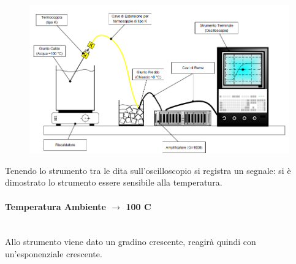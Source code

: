 \documentclass[a4paper, 12pt, twoside]{report}
\begin{document}
		\begin{figure}[H]
			\centering
			\includegraphics[width=0.5\linewidth]{immagini/catena1}
			\label{fig:catena1}
		\end{figure}		
		
		Tenendo lo strumento tra le dita sull'oscilloscopio si registra un segnale: si è dimostrato lo strumento essere sensibile alla temperatura. 
		
\newpage

		\paragraph{Temperatura Ambiente $\rightarrow$ 100 \degree C} \mbox{}\\
		Allo strumento viene dato un gradino crescente, reagirà quindi con un'esponenziale crescente. \newline
		
\end{document}
